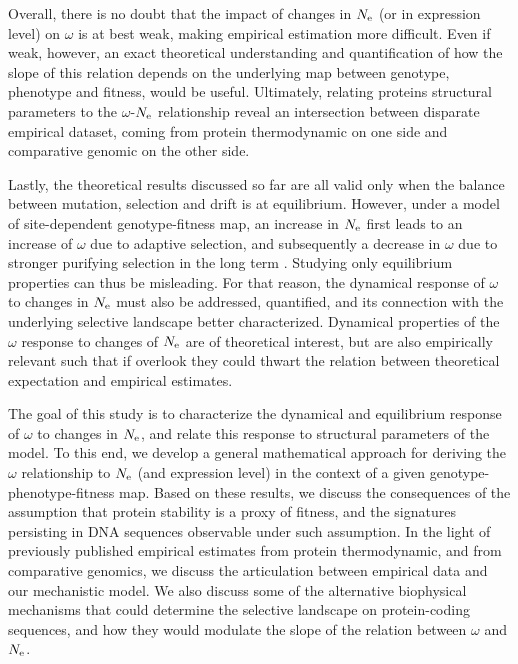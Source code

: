 \documentclass{article}
\begin{document}
	Overall, there is no doubt that the impact of changes in $N_{\mathrm{e}}$ (or in expression level) on $\omega$ is at best weak, making empirical estimation more difficult.
	Even if weak, however, an exact theoretical understanding and quantification of how the slope of this relation depends on the underlying map between genotype, phenotype and fitness, would be useful.
	Ultimately, relating proteins structural parameters to the $\omega$-$N_{\mathrm{e}}$ relationship reveal an intersection between disparate empirical dataset,  coming from protein thermodynamic on one side and comparative genomic on the other side. 
	
	Lastly, the theoretical results discussed so far are all valid only when the balance between mutation, selection and drift is at equilibrium. However, under a model of site-dependent genotype-fitness map, an increase in $N_{\mathrm{e}}$ first leads to an increase of $\omega$ due to adaptive selection, and subsequently a decrease in $\omega$ due to stronger purifying selection in the long term \cite{Jones2016}.
	Studying only equilibrium properties can thus be misleading. For that reason, the dynamical response of $\omega$ to changes in $N_{\mathrm{e}}$ must also be addressed, quantified, and its connection with the underlying selective landscape better characterized.
	Dynamical properties of the $\omega$ response to changes of $N_{\mathrm{e}}$ are of theoretical interest, but are also empirically relevant such that if overlook they could thwart the relation between theoretical expectation and empirical estimates.
	
	The goal of this study is to characterize the dynamical and equilibrium response of $\omega$ to changes in $N_{\mathrm{e}}$, and relate this response to structural parameters of the model.
	To this end, we develop a general mathematical approach for deriving the $\omega$ relationship to $N_{\mathrm{e}}$ (and expression level) in the context of a given genotype-phenotype-fitness map.
	Based on these results, we discuss the consequences of the assumption that protein stability is a proxy of fitness, and the signatures persisting in DNA sequences observable under such assumption.
	In the light of previously published empirical estimates from protein thermodynamic, and from comparative genomics, we discuss the articulation between empirical data and our mechanistic model.
	We also discuss some of the alternative biophysical mechanisms that could determine the selective landscape on protein-coding sequences, and how they would modulate the slope of the relation between $\omega$ and $N_{\mathrm{e}}$.
	
\end{document}
